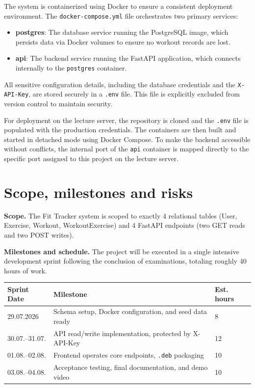 \documentclass[11pt,a4paper]{article}
\begin{document}
The system is containerized using Docker to ensure a consistent deployment environment. The \texttt{docker-compose.yml} file orchestrates two primary services:
\begin{itemize}
  \item \textbf{postgres}: The database service running the PostgreSQL image, which persists data via Docker volumes to ensure no workout records are lost.
  \item \textbf{api}: The backend service running the FastAPI application, which connects internally to the \texttt{postgres} container.
\end{itemize}

All sensitive configuration details, including the database credentials and the \texttt{X-API-Key}, are stored securely in a \texttt{.env} file. This file is explicitly excluded from version control to maintain security.

For deployment on the lecture server, the repository is cloned and the \texttt{.env} file is populated with the production credentials. The containers are then built and started in detached mode using Docker Compose. To make the backend accessible without conflicts, the internal port of the \texttt{api} container is mapped directly to the specific port assigned to this project on the lecture server.


\section{Scope, milestones and risks}

\textbf{Scope.} The Fit Tracker system is scoped to exactly 4 relational tables (User, Exercise, Workout, WorkoutExercise) and 4 FastAPI endpoints (two GET reads and two POST writes).

\textbf{Milestones and schedule.} The project will be executed in a single intensive development sprint following the conclusion of examinations, totaling roughly 40 hours of work.

\renewcommand{\arraystretch}{1.2}
\begin{tabularx}{\linewidth}{@{}p{2.5cm}Xp{1.8cm}@{}}
\toprule
\textbf{Sprint Date} & \textbf{Milestone} & \textbf{Est. hours} \\
\midrule
29.07.2026 & Schema setup, Docker configuration, and seed data ready & 8 \\
30.07.--31.07. & API read/write implementation, protected by X-API-Key & 12 \\
01.08.--02.08. & Frontend operates core endpoints, \texttt{.deb} packaging & 10 \\
03.08.--04.08. & Acceptance testing, final documentation, and demo video & 10 \\
\bottomrule
\end{tabularx}
\end{document}
